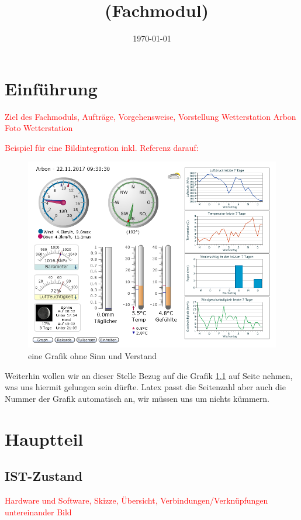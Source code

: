 \documentclass[a4paper,ngerman, 11pt, pagesize]{report}
\title{\projektName~(Fachmodul)}
\author{\authorName}
\date{\today}
\newcommand\Diskussionspunkt[1]{\textcolor{red}{#1}}
\begin{document}

\setcounter{page}{2}
\tableofcontents          
\clearpage
{}


\chapter{Einführung}

\Diskussionspunkt{Ziel des Fachmoduls, Aufträge, Vorgehensweise, Vorstellung Wetterstation Arbon}
\Diskussionspunkt{Foto Wetterstation}


\Diskussionspunkt{Beispiel für eine Bildintegration inkl. Referenz darauf:}
\begin{figure}[htbp]
	\centering
	\includegraphics[width=0.9\linewidth]{img/grafik}
	\caption{eine Grafik ohne Sinn und Verstand}
	\label{img:grafik-dummy}
\end{figure}

Weiterhin wollen wir an dieser Stelle Bezug auf die Grafik
\ref{img:grafik-dummy} auf Seite \pageref{img:grafik-dummy} nehmen, was uns
hiermit gelungen sein dürfte. Latex passt die Seitenzahl aber auch die Nummer
der Grafik automatisch an, wir müssen uns um nichts kümmern.

\chapter{Hauptteil}

\section{IST-Zustand}
\Diskussionspunkt{Hardware und Software, Skizze, Übersicht, Verbindungen/Verknüpfungen untereinander}
\Diskussionspunkt{Bild}
\end{document}

